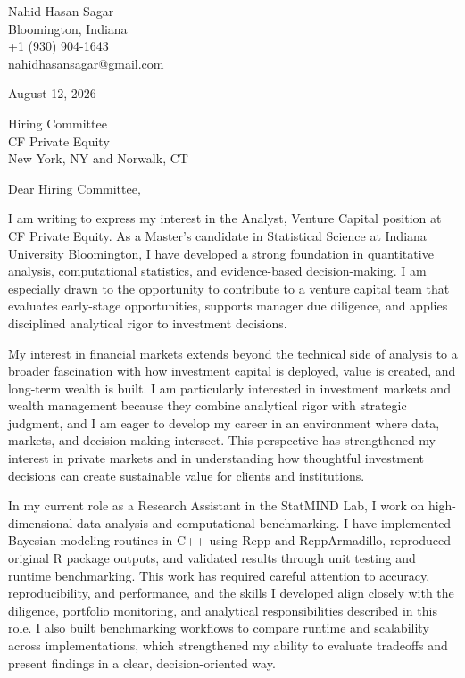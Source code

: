 \documentclass[10pt,letterpaper]{article}
\begin{document}
\begin{flushleft}
Nahid Hasan Sagar\\
Bloomington, Indiana\\
+1 (930) 904-1643\\
nahidhasansagar@gmail.com
\end{flushleft}

\vspace{1em}

August 12, 2026

Hiring Committee\\
CF Private Equity\\
New York, NY and Norwalk, CT

\vspace{1em}

Dear Hiring Committee,

\vspace{0.8em}

I am writing to express my interest in the Analyst, Venture Capital position at CF Private Equity. As a Master's candidate in Statistical Science at Indiana University Bloomington, I have developed a strong foundation in quantitative analysis, computational statistics, and evidence-based decision-making. I am especially drawn to the opportunity to contribute to a venture capital team that evaluates early-stage opportunities, supports manager due diligence, and applies disciplined analytical rigor to investment decisions.

My interest in financial markets extends beyond the technical side of analysis to a broader fascination with how investment capital is deployed, value is created, and long-term wealth is built. I am particularly interested in investment markets and wealth management because they combine analytical rigor with strategic judgment, and I am eager to develop my career in an environment where data, markets, and decision-making intersect. This perspective has strengthened my interest in private markets and in understanding how thoughtful investment decisions can create sustainable value for clients and institutions.

In my current role as a Research Assistant in the StatMIND Lab, I work on high-dimensional data analysis and computational benchmarking. I have implemented Bayesian modeling routines in C++ using Rcpp and RcppArmadillo, reproduced original R package outputs, and validated results through unit testing and runtime benchmarking. This work has required careful attention to accuracy, reproducibility, and performance, and the skills I developed align closely with the diligence, portfolio monitoring, and analytical responsibilities described in this role. I also built benchmarking workflows to compare runtime and scalability across implementations, which strengthened my ability to evaluate tradeoffs and present findings in a clear, decision-oriented way.
\end{document}
